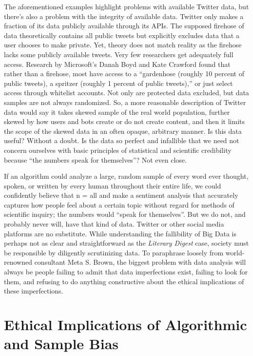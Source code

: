 \documentclass[sigconf]{acmart}
\begin{document}
	The aforementioned examples highlight problems with available Twitter data, but there's also a problem with the integrity of available data. Twitter only makes a fraction of its data publicly available through its APIs. The supposed firehose of data theoretically contains all public tweets but explicitly excludes data that a user chooses to make private. Yet, theory does not match reality as the firehose lacks some publicly available tweets. Very few researchers get adequately full access. Research by Microsoft's Danah Boyd and Kate Crawford found that rather than a firehose, most have access to a ``gardenhose (roughly 10 percent of public tweets), a spritzer (roughly 1 percent of public tweets),'' or just select access through whitelist accounts\cite{Boyd-Crawford2011}. Not only are protected data excluded, but data samples are not always randomized. So, a more reasonable description of Twitter data would say it takes skewed sample of the real world population, further skewed by how users and bots create or do not create content, and then it limits the scope of the skewed data in an often opaque, arbitrary manner.\cite{Boyd-Crawford2011} Is this data useful? Without a doubt. Is the data so perfect and infallible that we need not concern ourselves with basic principles of statistical and scientific credibility because ``the numbers speak for themselves''\cite{Anderson2008}? Not even close.

If an algorithm could analyze a large, random sample of every word ever thought, spoken, or written by every human throughout their entire life, we could confidently believe that n = all and make a sentiment analysis that accurately captures how people feel about a certain topic without regard for methods of scientific inquiry; the numbers would ``speak for themselves''\cite{Anderson2008}. But we do not, and probably never will, have that kind of data. Twitter or other social media platforms are no substitute. While understanding the fallibility of Big Data is perhaps not as clear and straightforward as the {\em Literary Digest} case, society must be responsible by diligently scrutinizing data. To paraphrase loosely from world-renowned consultant Meta S. Brown, the biggest problem with data analysis will always be people failing to admit that data imperfections exist, failing to look for them, and refusing to do anything constructive about the ethical implications of these imperfections.\cite{Brown2017}

\section{Ethical Implications of Algorithmic and Sample Bias}
\end{document}
